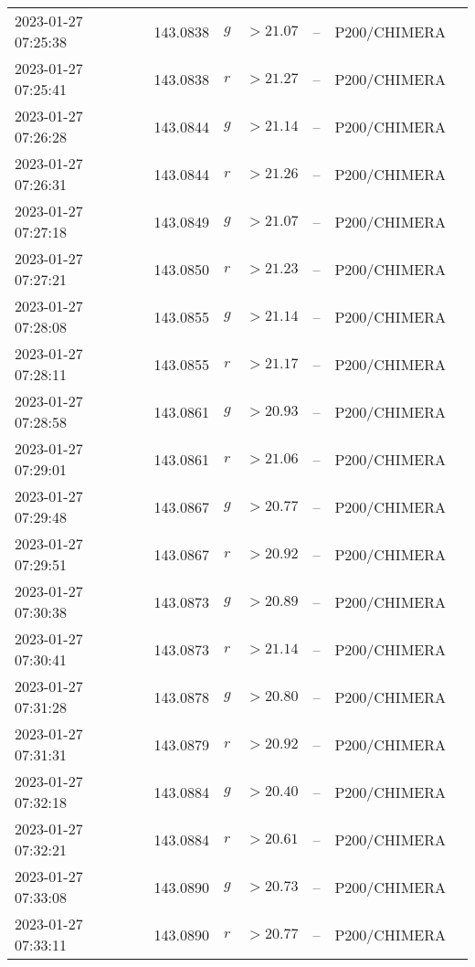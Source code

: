 \documentclass{nature_plusfigure}
\begin{document}
\begin{supplement}
\begin{center}
\begin{longtable}{lllllll}
2023-01-27 07:25:38 & 143.0838 & $g$ & $>21.07$ & -- & P200/CHIMERA &  \\ 
2023-01-27 07:25:41 & 143.0838 & $r$ & $>21.27$ & -- & P200/CHIMERA &  \\ 
2023-01-27 07:26:28 & 143.0844 & $g$ & $>21.14$ & -- & P200/CHIMERA &  \\ 
2023-01-27 07:26:31 & 143.0844 & $r$ & $>21.26$ & -- & P200/CHIMERA &  \\ 
2023-01-27 07:27:18 & 143.0849 & $g$ & $>21.07$ & -- & P200/CHIMERA &  \\ 
2023-01-27 07:27:21 & 143.0850 & $r$ & $>21.23$ & -- & P200/CHIMERA &  \\ 
2023-01-27 07:28:08 & 143.0855 & $g$ & $>21.14$ & -- & P200/CHIMERA &  \\ 
2023-01-27 07:28:11 & 143.0855 & $r$ & $>21.17$ & -- & P200/CHIMERA &  \\ 
2023-01-27 07:28:58 & 143.0861 & $g$ & $>20.93$ & -- & P200/CHIMERA &  \\ 
2023-01-27 07:29:01 & 143.0861 & $r$ & $>21.06$ & -- & P200/CHIMERA &  \\ 
2023-01-27 07:29:48 & 143.0867 & $g$ & $>20.77$ & -- & P200/CHIMERA &  \\ 
2023-01-27 07:29:51 & 143.0867 & $r$ & $>20.92$ & -- & P200/CHIMERA &  \\ 
2023-01-27 07:30:38 & 143.0873 & $g$ & $>20.89$ & -- & P200/CHIMERA &  \\ 
2023-01-27 07:30:41 & 143.0873 & $r$ & $>21.14$ & -- & P200/CHIMERA &  \\ 
2023-01-27 07:31:28 & 143.0878 & $g$ & $>20.80$ & -- & P200/CHIMERA &  \\ 
2023-01-27 07:31:31 & 143.0879 & $r$ & $>20.92$ & -- & P200/CHIMERA &  \\ 
2023-01-27 07:32:18 & 143.0884 & $g$ & $>20.40$ & -- & P200/CHIMERA &  \\ 
2023-01-27 07:32:21 & 143.0884 & $r$ & $>20.61$ & -- & P200/CHIMERA &  \\ 
2023-01-27 07:33:08 & 143.0890 & $g$ & $>20.73$ & -- & P200/CHIMERA &  \\ 
2023-01-27 07:33:11 & 143.0890 & $r$ & $>20.77$ & -- & P200/CHIMERA &  \\ 
\hline 
\end{longtable} 
\end{center} 


\clearpage


\end{supplement}
\end{document}
